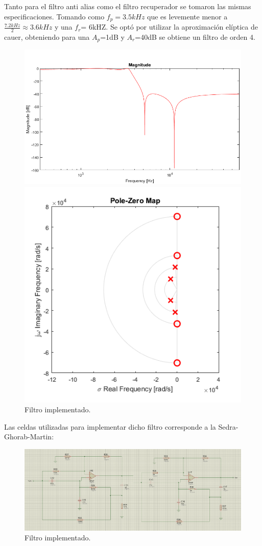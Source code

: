Tanto para el filtro anti alias como el filtro recuperador se tomaron las mismas especificaciones.
Tomando como $f_p= 3.5kHz$ que es levemente menor a $\frac{7.2kHz}{2}\approx 3.6kHz $ y una $f_r$= 6kHZ.
Se optó por utilizar la aproximación elíptica de cauer, obteniendo para una $A_p$=1dB y $A_r$=40dB se obtiene un filtro de orden 4.
\begin{figure}[H]
\centering
\includegraphics[width=0.7\linewidth, page=1]{ImagenesEjercicio1/magnitude.png}

\includegraphics[width=0.5\linewidth, page=1]{ImagenesEjercicio1/pz.png}
\caption{Filtro implementado.}
\label{filtros}
\end{figure}

Las celdas utilizadas para implementar dicho filtro corresponde a la Sedra-Ghorab-Martin:
\begin{figure}[H]
\centering
\includegraphics[width=0.8\linewidth, page=1]{ImagenesEjercicio1/celdasSedras.png}
\caption{Filtro implementado.}
\label{filtros}
\end{figure}

